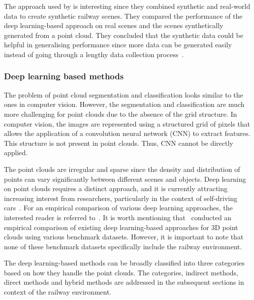 The approach used by \citeauthor{uggla2021towards} is interesting since they combined synthetic and real-world data to create synthetic railway scenes. They compared the performance of the deep learning-based approach on real scenes and the scenes synthetically generated from a point cloud. They concluded that the synthetic data could be helpful in generalising performance since more data can be generated easily instead of going through a lengthy data collection process~\cite{uggla2021towards}. 

\subsubsection{Deep learning based methods}
The problem of point cloud segmentation and classification looks similar to the ones in computer vision. However, the segmentation and classification are much more challenging for point clouds due to the absence of the grid structure. In computer vision, the images are represented using a structured grid of pixels that allows the application of a convolution neural network (CNN) to extract features. This structure is not present in point clouds. Thus, CNN cannot be directly applied. 

The point clouds are irregular and sparse since the density and distribution of points can vary significantly between different scenes and objects. 
Deep learning on point clouds requires a distinct approach, and it is currently attracting increasing interest from researchers, particularly in the context of self-driving cars~\cite{li2020deep}. For an empirical comparison of various deep learning approaches, the interested reader is referred to~\cite{guo2020deep}. It is worth mentioning that~\citeauthor{guo2020deep} conducted an empirical comparison of existing deep learning-based approaches for 3D point clouds using various benchmark datasets. However, it is important to note that none of these benchmark datasets specifically include the railway environment. 

The deep learning-based methods can be broadly classified into three categories based on how they handle the point clouds. The categories, indirect methods, direct methods and hybrid methods are addressed in the subsequent sections in context of the railway environment. 

